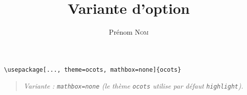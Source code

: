 \documentclass[11pt]{ocots-book}
\title{Variante d'option}
\author{Prénom \textsc{Nom}}
\newcommand{\ocotsvariantnote}[1]{\begin{quote}\itshape Variante : #1\end{quote}}
\begin{document}
\maketitle

\begin{lstlisting}
\usepackage[..., theme=ocots, mathbox=none]{ocots}
\end{lstlisting}
\ocotsvariantnote{\texttt{mathbox=none} (le th\`eme \texttt{ocots} utilise par d\'efaut \texttt{highlight}).}

\end{document}

